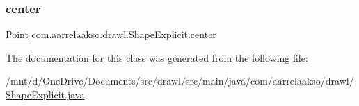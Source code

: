 \subsubsection{\texorpdfstring{center}{center}}
{\footnotesize\ttfamily \hyperlink{classcom_1_1aarrelaakso_1_1drawl_1_1_point}{Point} com.\+aarrelaakso.\+drawl.\+Shape\+Explicit.\+center\hspace{0.3cm}{\ttfamily [private]}}



The documentation for this class was generated from the following file\+:\begin{DoxyCompactItemize}
\item 
/mnt/d/\+One\+Drive/\+Documents/src/drawl/src/main/java/com/aarrelaakso/drawl/\hyperlink{_shape_explicit_8java}{Shape\+Explicit.\+java}\end{DoxyCompactItemize}
